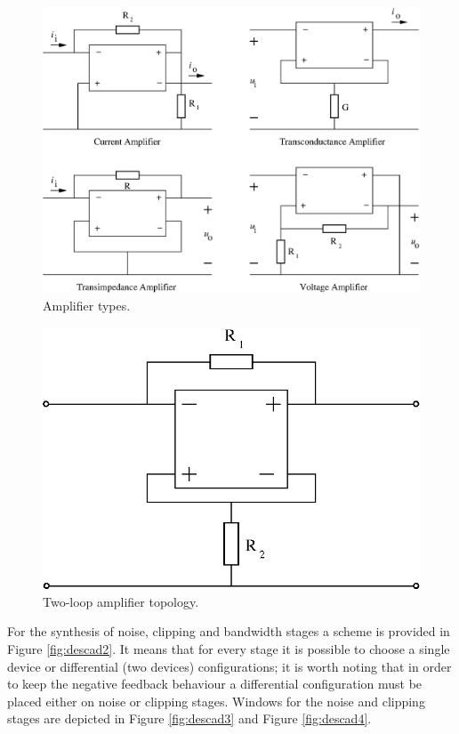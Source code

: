 \documentclass[twocolumn]{IEEEtran}
\begin{document}
\begin{figure}[hbtp]
	\centering
	\includegraphics[scale=0.5]{figures/grupo_eng.eps}
	\caption{Amplifier types.}
	\label{fig:amps}
\end{figure}

\begin{figure}[hbtp]
	\centering
	\includegraphics[scale=0.5]{figures/twoloop_basica.eps}
	\caption{Two-loop amplifier topology.}
	\label{fig:two_loop}
\end{figure}

For the synthesis of noise, clipping and bandwidth stages a scheme is provided in Figure \ref{fig:descad2}. It means that for every stage it is possible to choose a single device or differential (two devices) configurations; it is worth noting that in order to keep the negative feedback behaviour a differential configuration must be placed either on noise or clipping stages. Windows for the noise and clipping stages are depicted in Figure \ref{fig:descad3} and Figure \ref{fig:descad4}.
\end{document}
